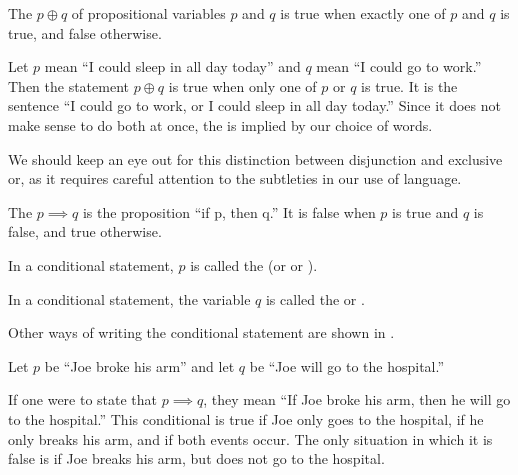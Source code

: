 \begin{defn}[exclusive or]
  The 
  $p \oplus q$
  of propositional variables
  $p$ and $q$ is true when exactly one of $p$ and $q$ is true,
  and false otherwise.
\end{defn}

\begin{ex}
  Let $p$ mean ``I could sleep in all day today''
  and $q$ mean ``I could go to work.''
  Then the statement $p \oplus q$ is true when only one of $p$ or $q$ is true.
  It is the sentence ``I could go to work, or I could sleep in all day today.''
  Since it does not make sense to do both at once,
  the  is implied by our choice of words.
  \begin{remark}
    We should keep an eye out for this distinction between disjunction and
    exclusive or, as it requires careful attention to the subtleties in our use of
    language.
  \end{remark}
  \label{ex:prop:xordefn}
\end{ex}

\begin{defn}
  The 
  $p \implies q$
  is the proposition ``if p, then q.''
  It is false when $p$ is true and $q$ is false, and true otherwise.
  \label{def:conditional}
\end{defn}

\begin{defn}[hypothesis]
  In a conditional statement, $p$ is called the 
  (or  or ).
\end{defn}

\begin{defn}[conclusion]
  In a conditional statement, the variable $q$ is called the 
  or .

  Other ways of writing the conditional statement are shown in .
\end{defn}

\begin{ex}
  Let $p$ be ``Joe broke his arm''
  and let $q$ be ``Joe will go to the hospital.''

  If one were to state that $p \implies q$, they mean
  ``If Joe broke his arm, then he will go to the hospital.''
  This conditional is true if Joe only goes to the hospital,
  if he only breaks his arm, and if both events occur.
  The only situation in which it is false is if Joe breaks his arm,
  but does not go to the hospital.
\end{ex}

